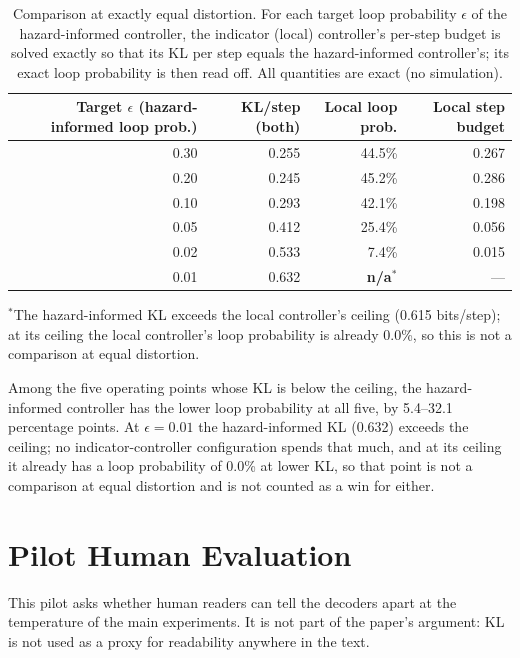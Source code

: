 \documentclass[make,article,submit,pdftex]{Definitions/mdpi}
\begin{document}
\begin{table}[H]
\centering
\caption{Comparison at exactly equal distortion. For each target loop probability $\epsilon$ of the hazard-informed controller, the indicator (local) controller's per-step budget is solved exactly so that its KL per step equals the hazard-informed controller's; its exact loop probability is then read off. All quantities are exact (no simulation).}
\label{tab:synthetic}
\begin{tabular}{@{}rrrr@{}}
\toprule
Target $\epsilon$ (hazard-informed loop prob.) & KL/step (both) & Local loop prob. & Local step budget \\
\midrule
0.30 & 0.255 & 44.5\% & 0.267 \\
0.20 & 0.245 & 45.2\% & 0.286 \\
0.10 & 0.293 & 42.1\% & 0.198 \\
0.05 & 0.412 & 25.4\% & 0.056 \\
0.02 & 0.533 & 7.4\% & 0.015 \\
0.01 & 0.632 & \textbf{n/a}$^{*}$ & --- \\
\bottomrule
\end{tabular}

\vspace{4pt}
{\footnotesize $^{*}$The hazard-informed KL exceeds the local controller's ceiling (0.615 bits/step); at its ceiling the local controller's loop probability is already 0.0\%, so this is not a comparison at equal distortion.}
\end{table}

Among the five operating points whose KL is below the ceiling, the hazard-informed controller has the lower loop probability at all five, by 5.4--32.1 percentage points. At $\epsilon{=}0.01$ the hazard-informed KL (0.632) exceeds the ceiling; no indicator-controller configuration spends that much, and at its ceiling it already has a loop probability of 0.0\% at lower KL, so that point is not a comparison at equal distortion and is not counted as a win for either.


\section{Pilot Human Evaluation}
\label{sec:human-eval}

This pilot asks whether human readers can tell the decoders apart at the temperature of the main experiments. It is not part of the paper's argument: KL is not used as a proxy for readability anywhere in the text.
\end{document}
